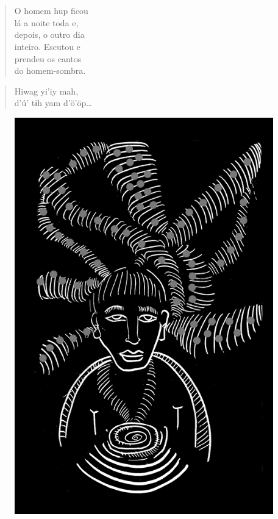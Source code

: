\chapter*{}

\mbox{}\vspace*{\fill}

\begin{verse}
O homem hup ficou\\
lá a noite toda e,\\
depois, o outro dia\\
inteiro. Escutou e\\
prendeu os cantos\\
do homem-sombra.
\end{verse}

\begin{verse}
Hiwag yi’iy mah,\\
d’ú’ tɨh yam d’ö’öp\ldots{}
\end{verse}

\vspace*{\fill}

\begin{figure}
\vspace*{-1.2cm}
\hspace*{-2.2cm}\includegraphics[width=138mm]{./imgs/img4.jpg}
\end{figure}


